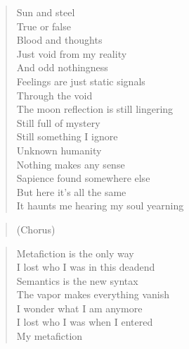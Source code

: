 \begin{minipage}{0.6\textwidth}

    \begin{verse}
    Sun and steel \\
	True or false  \\
	Blood and thoughts \\
	Just void from my reality \\
	And odd nothingness \\
	Feelings are just static signals \\
	Through the void \\
	The moon reflection is still lingering \\
	Still full of mystery \\
	Still something I ignore \\
	Unknown humanity \\
	Nothing makes any sense \\
	Sapience found somewhere else \\
	But here it's all the same \\
	It haunts me hearing my soul yearning
    \end{verse}

    \begin{verse}
    (Chorus)
    \end{verse}

    \begin{verse}
    Metafiction is the only way \\
	I lost who I was in this deadend \\
	Semantics is the new syntax \\
	The vapor makes everything vanish \\
	I wonder what I am anymore \\
	I lost who I was when I entered \\
	My metafiction
    \end{verse}

\end{minipage}
\clearpage
